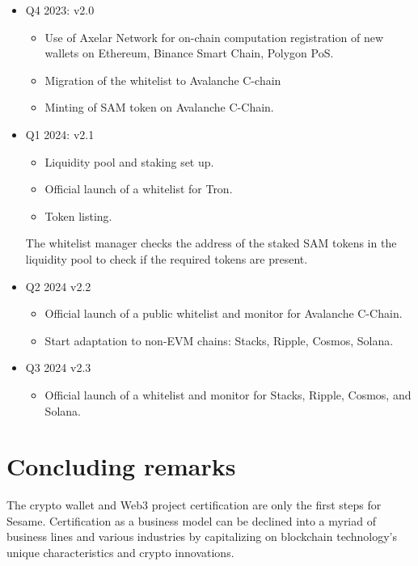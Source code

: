 ﻿\documentclass[a4paper]{article}
\begin{document}
\begin{itemize}
\item
Q4 2023: v2.0
    \begin{itemize}
    \item Use of Axelar Network for on-chain computation registration of new wallets on Ethereum, Binance Smart Chain, Polygon PoS.
    \item Migration of the whitelist to Avalanche C-chain
    \item Minting of SAM token on Avalanche C-Chain.
    \end{itemize}

\item
Q1 2024: v2.1
    \begin{itemize}
    \item Liquidity pool and staking set up. 
    \item Official launch of a whitelist for Tron.
    \item Token listing.
    \end{itemize}

The whitelist manager checks the address of the staked SAM tokens in the liquidity pool to check if the required tokens are present.

\item
Q2 2024 v2.2
    \begin{itemize}
    \item Official launch of a public whitelist and monitor for Avalanche C-Chain.
    \item Start adaptation to non-EVM chains: Stacks, Ripple, Cosmos, Solana.
    \end{itemize}

\item
Q3 2024 v2.3
    \begin{itemize}
    \item Official launch of a whitelist and monitor for Stacks, Ripple, Cosmos, and Solana.
    \end{itemize}
\end{itemize}

\newpage
\section{Concluding remarks}


The crypto wallet and Web3 project certification are only the first steps for Sesame. Certification as a business model can be declined into a myriad of business lines and various industries by capitalizing on blockchain technology's unique characteristics and crypto innovations. \\
\end{document}
